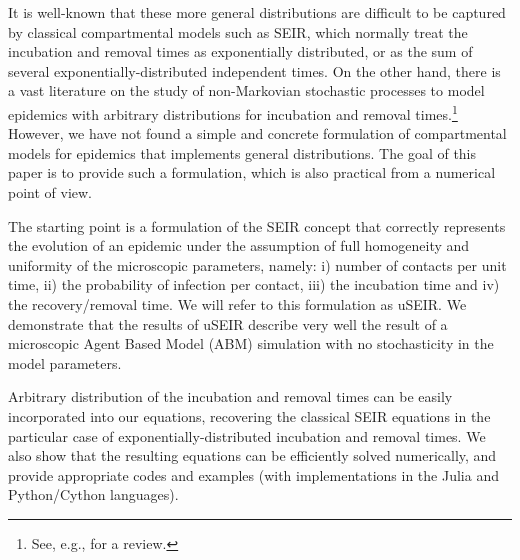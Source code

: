 \documentclass[a4paper,oneside,11pt]{article}
\begin{document}
{It is well-known that these more general distributions are difficult to be captured by
classical compartmental models such as SEIR, which normally treat the incubation and removal times as exponentially
distributed, or as the sum of several exponentially-distributed independent times. On the other hand, there is a vast
literature on the study of non-Markovian stochastic processes to model epidemics with arbitrary distributions
for incubation and removal times.\footnote{See, e.g., \cite{stocrev} for a review.}
However, we have not found a simple and concrete formulation of compartmental models for epidemics that
implements general distributions. The goal of this paper is to provide such a formulation, which is also practical from a numerical point of view.}


The starting point is a formulation of the SEIR concept that correctly 
represents the evolution of an epidemic under the assumption of full homogeneity and uniformity of the microscopic parameters, namely: i) number of contacts per unit time, ii) the probability of infection per contact, iii) the incubation time and iv) the recovery/removal time. We will refer to this formulation as uSEIR. We demonstrate that the results of uSEIR describe very well the result of a microscopic Agent Based Model (ABM) simulation with no stochasticity in the model parameters.

Arbitrary distribution of the incubation and removal times can be easily  incorporated into our equations, recovering the classical SEIR equations in the particular case of exponentially-distributed incubation and {removal} times. We also show that the resulting equations can be efficiently solved numerically, and provide appropriate codes and examples (with implementations in the Julia and Python/Cython languages). 
\end{document}
